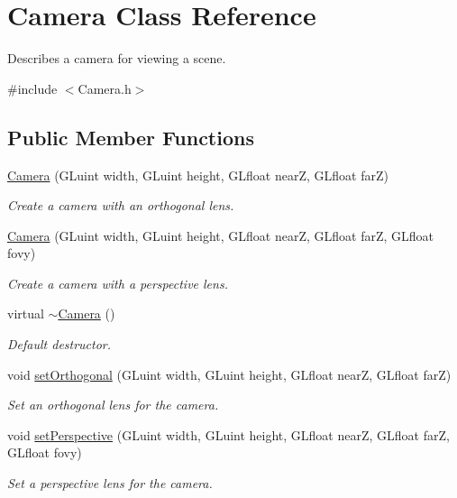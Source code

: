 \hypertarget{class_camera}{}\section{Camera Class Reference}
\label{class_camera}


Describes a camera for viewing a scene.  




{\ttfamily \#include $<$Camera.\+h$>$}

\subsection*{Public Member Functions}
\begin{DoxyCompactItemize}
\item 
\hyperlink{class_camera_ac817e3c9d822bca54936a3bc70245137}{Camera} (G\+Luint width, G\+Luint height, G\+Lfloat nearZ, G\+Lfloat farZ)
\begin{DoxyCompactList}\small\item\em Create a camera with an orthogonal lens. \end{DoxyCompactList}\item 
\hyperlink{class_camera_a25980407bbf15173f5dbcf34260ac841}{Camera} (G\+Luint width, G\+Luint height, G\+Lfloat nearZ, G\+Lfloat farZ, G\+Lfloat fovy)
\begin{DoxyCompactList}\small\item\em Create a camera with a perspective lens. \end{DoxyCompactList}\item 
virtual \hyperlink{class_camera_ad1897942d0ccf91052386388a497349f}{$\sim$\+Camera} ()
\begin{DoxyCompactList}\small\item\em Default destructor. \end{DoxyCompactList}\item 
void \hyperlink{class_camera_a163d38c1b0f1690a55e677cf7861b457}{set\+Orthogonal} (G\+Luint width, G\+Luint height, G\+Lfloat nearZ, G\+Lfloat farZ)
\begin{DoxyCompactList}\small\item\em Set an orthogonal lens for the camera. \end{DoxyCompactList}\item 
void \hyperlink{class_camera_a2488706c1ca5e9c4bc92dfef65c91aae}{set\+Perspective} (G\+Luint width, G\+Luint height, G\+Lfloat nearZ, G\+Lfloat farZ, G\+Lfloat fovy)
\begin{DoxyCompactList}\small\item\em Set a perspective lens for the camera. \end{DoxyCompactList}\item 

\end{DoxyCompactItemize}
